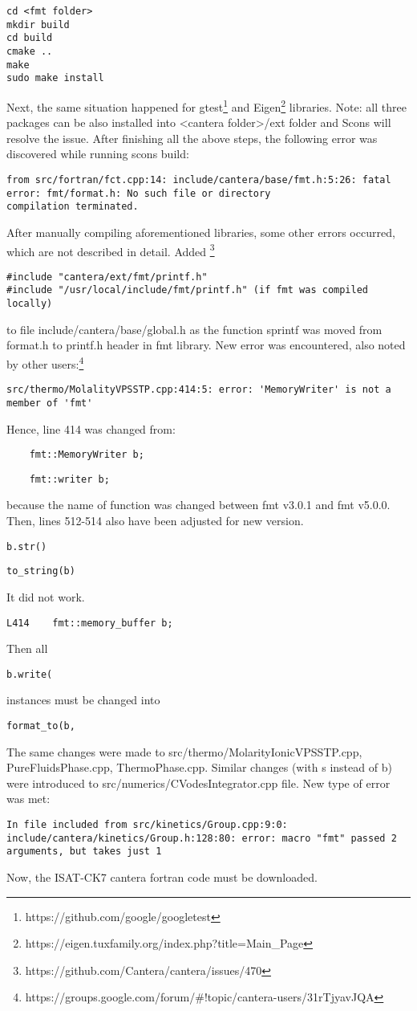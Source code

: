 \documentclass[12pt,english]{article}
\begin{document}
\begin{lstlisting}
cd <fmt folder>
mkdir build
cd build
cmake ..
make 
sudo make install
\end{lstlisting}
Next, the same situation happened for gtest\footnote{https://github.com/google/googletest} and Eigen\footnote{https://eigen.tuxfamily.org/index.php?title=Main_Page} libraries. {{{Note: all three packages can be also installed into <cantera folder>/ext folder and Scons will resolve the issue}}}. After finishing all the above steps, the following error was discovered while running scons build:
\begin{lstlisting}
from src/fortran/fct.cpp:14: include/cantera/base/fmt.h:5:26: fatal error: fmt/format.h: No such file or directory
compilation terminated.
\end{lstlisting}
After manually compiling aforementioned libraries, some other errors occurred, which are not described in detail.	
Added \footnote{https://github.com/Cantera/cantera/issues/470}
\begin{lstlisting}
#include "cantera/ext/fmt/printf.h"
#include "/usr/local/include/fmt/printf.h" (if fmt was compiled locally)
\end{lstlisting}
to file include/cantera/base/global.h as the function sprintf was moved from format.h to printf.h header in fmt library.
New error was encountered, also noted by other users:\footnote{https://groups.google.com/forum/#!topic/cantera-users/31rTjyavJQA}
\begin{lstlisting}
src/thermo/MolalityVPSSTP.cpp:414:5: error: 'MemoryWriter' is not a member of 'fmt'
\end{lstlisting}
Hence, line 414 was changed from:
\begin{lstlisting}
    fmt::MemoryWriter b;
\end{lstlisting}
\begin{lstlisting}
    fmt::writer b;
\end{lstlisting}
because the name of function was changed between fmt v3.0.1 and fmt v5.0.0. Then, lines 512-514 also have been adjusted for new version.
\begin{lstlisting}
b.str()
\end{lstlisting}
\begin{lstlisting}
to_string(b)
\end{lstlisting}
It did not work.
\begin{lstlisting}
L414    fmt::memory_buffer b;
\end{lstlisting}
Then all 
\begin{lstlisting}
b.write(
\end{lstlisting} 
instances must be changed into 
\begin{lstlisting}
format_to(b,
\end{lstlisting} 
The same changes were made to src/thermo/MolarityIonicVPSSTP.cpp, PureFluidsPhase.cpp, ThermoPhase.cpp. Similar changes (with s instead of b) were introduced to src/numerics/CVodesIntegrator.cpp file.
New type of error was met:
\begin{lstlisting}
In file included from src/kinetics/Group.cpp:9:0:
include/cantera/kinetics/Group.h:128:80: error: macro "fmt" passed 2 arguments, but takes just 1
\end{lstlisting}

Now, the ISAT-CK7 cantera fortran code must be downloaded.
	
\end{document}
